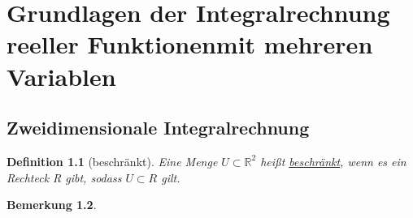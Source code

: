 \documentclass[fontset=ubuntu,12pt,a4paper]{scrreprt}
\newtheorem{defi}{Definition}[section]
\newtheorem{bemerkung}[defi]{Bemerkung}
\begin{document}
\chapter{Grundlagen der Integralrechnung reeller Funktionenmit mehreren Variablen}

    \section{Zweidimensionale Integralrechnung}

    \begin{defi}[beschränkt]
        Eine Menge \(U\subset\mathbb{R}^2\) heißt \underline{beschränkt}, wenn es ein Rechteck R gibt, sodass \(U\subset R\) gilt.
    \end{defi}

    \begin{bemerkung}
    \end{bemerkung}
    
\end{document}
